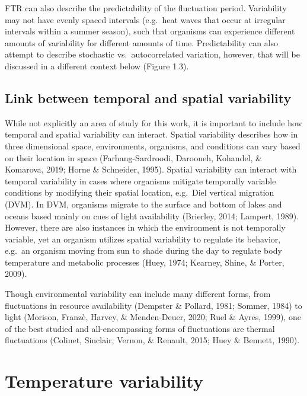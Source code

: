 \documentclass[12pt,twoside]{reedthesis}
\begin{document}
FTR can also describe the predictability of the fluctuation period. Variability may not have evenly spaced intervals (e.g.~heat waves that occur at irregular intervals within a summer season), such that organisms can experience different amounts of variability for different amounts of time. Predictability can also attempt to describe stochastic vs.~autocorrelated variation, however, that will be discussed in a different context below (Figure 1.3).

\hypertarget{link-between-temporal-and-spatial-variability}{%
\subsection{Link between temporal and spatial variability}\label{link-between-temporal-and-spatial-variability}}

While not explicitly an area of study for this work, it is important to include how temporal and spatial variability can interact. Spatial variability describes how in three dimensional space, environments, organisms, and conditions can vary based on their location in space (Farhang-Sardroodi, Darooneh, Kohandel, \& Komarova, 2019; Horne \& Schneider, 1995). Spatial variability can interact with temporal variability in cases where organisms mitigate temporally variable conditions by modifying their spatial location, e.g.~Diel vertical migration (DVM). In DVM, organisms migrate to the surface and bottom of lakes and oceans based mainly on cues of light availability (Brierley, 2014; Lampert, 1989). However, there are also instances in which the environment is not temporally variable, yet an organism utilizes spatial variability to regulate its behavior, e.g.~an organism moving from sun to shade during the day to regulate body temperature and metabolic processes (Huey, 1974; Kearney, Shine, \& Porter, 2009).

Though environmental variability can include many different forms, from fluctuations in resource availability
(Dempster \& Pollard, 1981; Sommer, 1984) to light (Morison, Franzè, Harvey, \& Menden‐Deuer, 2020; Ruel \& Ayres, 1999), one of the best studied and all-encompassing forms of fluctuations are thermal fluctuations (Colinet, Sinclair, Vernon, \& Renault, 2015; Huey \& Bennett, 1990).

\hypertarget{temperature-variability}{%
\section{Temperature variability}\label{temperature-variability}}
\end{document}
